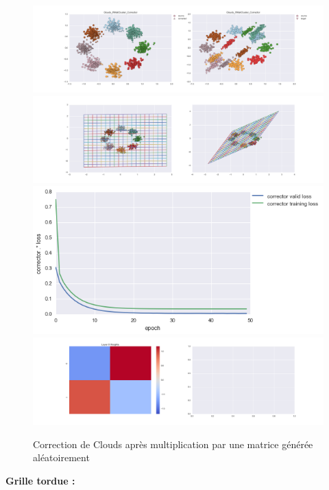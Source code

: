 \begin{figure}[H] %
\centering
\includegraphics[width=\linewidth]{fig/24-05-2016/clouds/Clouds_RMatCluster_Corrector-DATA.png}
\includegraphics[width=\linewidth]{fig/24-05-2016/clouds/Clouds_RMatCluster_Corrector-GridCheck.png}
\includegraphics[width=0.45\linewidth]{fig/24-05-2016/clouds/Clouds_RMatCluster_Corrector-Learning_curve.png}
\includegraphics[width=\linewidth]{fig/24-05-2016/clouds/Clouds_RMatCluster_Corrector-W.png}
\caption{Correction de Clouds après multiplication par une matrice générée aléatoirement}
\label{fig:recap-clouds-RMat-cluster}
\end{figure}

{\Large \textbf{Grille tordue :}}

